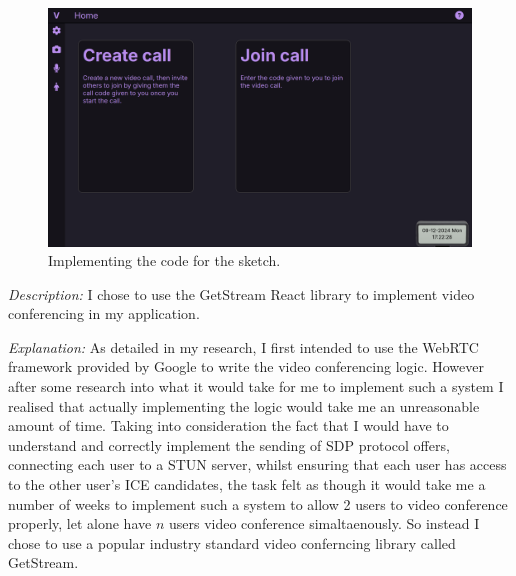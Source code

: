 \begin{figure}[H]
\centering

\includegraphics[scale=0.2]{Images/Sketch_final.png}

\caption{Implementing the code for the sketch.}
\end{figure}

\textit{Description:} I chose to use the GetStream React
library to implement video conferencing in my application. \\ 
\vspace{0.2cm}

\textit{Explanation:} As detailed in my research, I first 
intended to use the WebRTC framework provided by Google to 
write the video conferencing logic. However after some research 
into what it would take for me to implement such a system I 
realised that actually implementing the logic would take me 
an unreasonable amount of time. Taking into consideration the
fact that I would have to understand and correctly implement 
the sending of SDP protocol offers, connecting each user to a
STUN server, whilst ensuring that each user has access to 
the other user's ICE candidates, the task felt as though it
would take me a number of weeks to implement such a system 
to allow 2 users to video conference properly, let alone have 
$n$ users video conference simaltaenously. So instead I chose 
to use a popular industry standard video conferncing library 
called GetStream. \\ \vspace{0.2cm}


